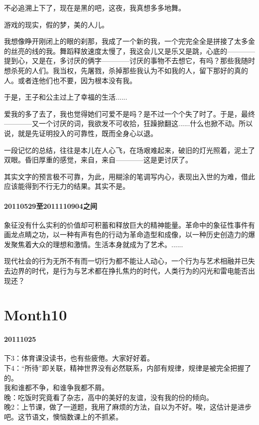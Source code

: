 \documentclass[UTF8]{Diaries}
\begin{document}
不必追溯上下了，现在是黑的吧，这夜，我真想多多地舞。

游戏的现实，假的梦，美的人儿。

我想像睁开刚闭上的眼的刹那，我成了一个新的我，一个完完全全是拼接了太多金的丝亮的线的我。舞蹈释放速度太慢了，我这会儿又是乐又是跳，心底的————提到心，又是在，多讨厌的俩字————讨厌的事物不去想它，有吗？那些我随时想杀死的人们。我当权，先屠戮，杀掉那些我认为不如我的人，留下那好的真的人。或者连他们也不要，因为根本没有我。

于是，王子和公主过上了幸福的生活......

爱我的多了去了，我也觉得她们可爱不是吗？是不过一个个失了时了。于是，最终————又一个讨厌的词，我欲发不可收拾，狂躁掀翻这......什么也掀不动。所以说，就是先证明投入的可靠性，既而全身心以退。

一段记忆的总结，往往是本儿在人心飞，在场艰难起来，破旧的灯光照着，泥土了双眼。昏旧厚重的感觉，来自，来自————这是更讨厌了。

其实文字的预言极不可靠，为此，用糊涂的笔调写内心，表现出入世的为难，借此应该能得到不行无力的结果。其实不是。


\paragraph{20110529至2011110904之间}

象征没有什么实利的价值却可积蓄和释放巨大的精神能量。革命中的象征性事件有画龙点睛之功，以一种有声有色的行动为革命造型和成像，以一种历史创造力的爆发聚焦着大众的理想和激情。生活本身就成为了艺术。......

现代社会的行为无所不有而一切行为都不能让人动心，一个行为与艺术相融并已失去边界的时代，是行为与艺术都在挣扎焦灼的时代，人类行为的闪光和雷电能否出现还？


 





\section{Month10}
\paragraph{20111025}
下3：体育课没读书，也有些疲倦。大家好好着。\\
下4：“所待”即关联，精神世界没有必然联系，内部有规律，规律是被完全把握了的。\\
我和谁都不争，和谁争我都不屑。\\
晚：吃饭时究竟看了杂志，高中的美好的友谊，没有我的份的倾向。\\
晚2：上节课，做了一道题，我用了麻烦的方法，自以为不好。唉，这估计是进步吧。这节语文，懊恼数课上的不抓紧。
\end{document}
